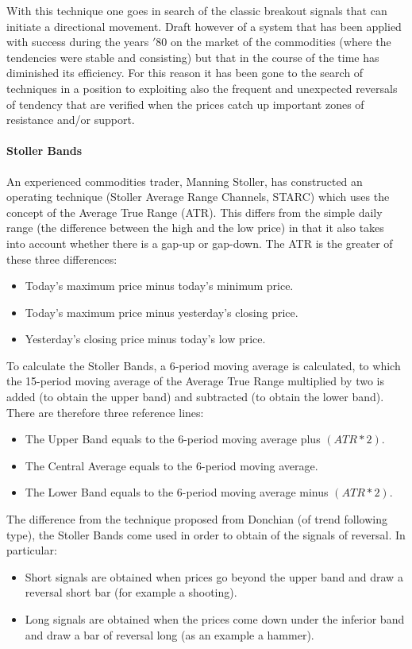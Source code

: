 With this technique one goes in search of the classic breakout signals that can initiate a directional movement. Draft however of a system that has been applied with success during the years $'80$ on the market of the commodities (where the tendencies were stable and consisting) but that in the course of the time has diminished its efficiency. For this reason it has been gone to the search of techniques in a position to exploiting also the frequent and unexpected reversals of tendency that are verified when the prices catch up important zones of resistance and/or support.

\paragraph{\textbf{Stoller Bands}}\mbox{}

An experienced commodities trader, Manning Stoller, has constructed an operating technique (Stoller Average Range Channels, STARC) which uses the concept of the Average True Range (ATR). This differs from the simple daily range (the difference between the high and the low price) in that it also takes into account whether there is a gap-up or gap-down.
The ATR is the greater of these three differences:

\begin{itemize}
\setlength\itemsep{0.3em}
\item Today's maximum price minus today's minimum price.
\item Today's maximum price minus yesterday's closing price.
\item Yesterday's closing price minus today's low price.
\end{itemize}  


To calculate the Stoller Bands, a 6-period moving average is calculated, to which the 15-period moving average of the Average True Range multiplied by two is added (to obtain the upper band) and subtracted (to obtain the lower band).
There are therefore three reference lines:

\begin{itemize}
\setlength\itemsep{0.3em}
\item The Upper Band equals to the 6-period moving average plus $(ATR*2)$.
\item The Central Average equals to the 6-period moving average.
\item The Lower Band equals to the 6-period moving average minus $(ATR*2)$.
\end{itemize}  


The difference from the technique proposed from Donchian (of trend following type), the Stoller Bands come used in order to obtain of the signals of reversal. In particular:

\begin{itemize}
\setlength\itemsep{0.3em}
\item Short signals are obtained when prices go beyond the upper band and draw a reversal short bar (for example a shooting).
\item Long signals are obtained when the prices come down under the inferior band and draw a bar of reversal long (as an example a hammer).
\end{itemize} 
